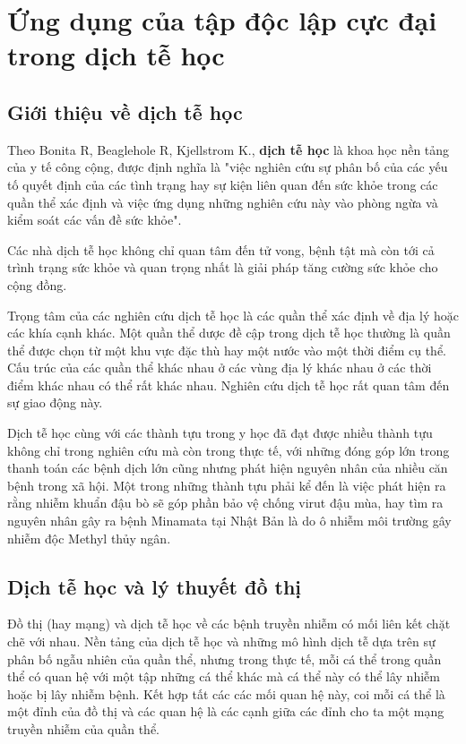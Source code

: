 \documentclass[14pt, oneside, a4paper, openany]{scrartcl}
\begin{document}

\newpage
\section{Ứng dụng của tập độc lập cực đại trong dịch tễ học}
\subsection{Giới thiệu về dịch tễ học}
Theo Bonita R, Beaglehole R, Kjellstrom K.\cite{BasicEpid}, \textbf{dịch tễ học}   là khoa học nền tảng của y tế công cộng, được định nghĩa là "việc nghiên cứu sự phân bố của các yếu tố quyết định của các tình trạng hay sự kiện liên quan đến sức khỏe trong các quần thể xác định và việc ứng dụng những nghiên cứu này vào phòng ngừa và kiểm soát các vấn đề sức khỏe". 

Các nhà dịch tễ học không chỉ quan tâm đến tử vong, bệnh tật mà còn tới cả trình trạng sức khỏe và quan trọng nhất là giải pháp tăng cường sức khỏe cho cộng đồng.

Trọng tâm của các nghiên cứu dịch tễ học là các quần thể xác định về địa lý hoặc các khía cạnh khác. Một quần thể dược đề cập trong dịch tễ học thường là quần thể được chọn từ một khu vực đặc thù hay một nước vào một thời điểm cụ thể. Cấu trúc của các quần thể khác nhau ở các vùng địa lý khác nhau ở các thời điểm khác nhau có thể rất khác nhau. Nghiên cứu dịch tễ học rất quan tâm đến sự giao động này.

Dịch tễ học cùng với các thành tựu trong y học đã đạt được nhiều thành tựu không chỉ trong nghiên cứu mà còn trong thực tế, với những đóng góp lớn trong thanh toán các bệnh dịch lớn cũng nhưng phát hiện nguyên nhân của nhiều căn bệnh trong xã hội. 
Một trong những thành tựu phải kể đến là việc phát hiện ra rằng nhiễm khuẩn đậu bò sẽ góp phần bảo vệ chống virut đậu mùa, hay tìm ra nguyên nhân gây ra bệnh Minamata tại Nhật Bản là do ô nhiễm môi trường gây nhiễm độc Methyl thủy ngân.

\subsection{Dịch tễ học và lý thuyết đồ thị}
Đồ thị (hay mạng) và dịch tễ học về các bệnh truyền nhiễm có mối liên kết chặt chẽ với nhau. Nền tảng của dịch tễ học và những mô hình dịch tễ dựa trên sự phân bố ngẫu nhiên của quần thể, nhưng trong thực tế, mỗi cá thể trong quần thể có quan hệ với một tập những cá thể khác mà cá thể này có thể lây nhiễm hoặc bị lây nhiễm bệnh. Kết hợp tất các các mối quan hệ này, coi mỗi cá thể là một đỉnh của đồ thị và các quan hệ là các cạnh giữa các đỉnh cho ta một mạng truyền nhiễm của quần thể.
\end{document}
